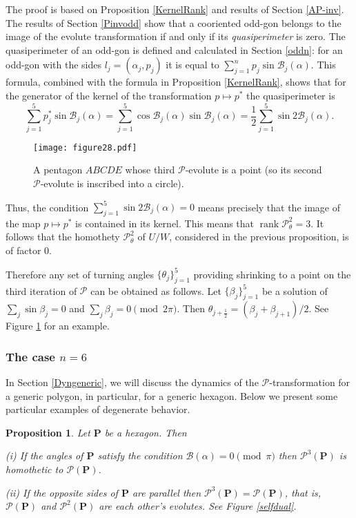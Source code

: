 \documentclass[12pt]{article}
\makeatletter
\newtheorem{proposition}[lemma]{Proposition}
\renewenvironment{proof}[1][\proofname] 
{\par\pushQED{\qed}\normalfont\topsep6\p@\@plus6\p@\relax\trivlist\item[\hskip\labelsep\bfseries#1\@addpunct{.}]\ignorespaces}{\popQED\endtrivlist\@endpefalse}
\newcommand{\B}{\mathcal{B}}
\newcommand{\Pev}{\mathcal{P}}
\renewcommand{\P}{\mathbf{P}}
\newcommand{\rk}{\operatorname{rank}}
\makeatother
\begin{document}
\begin{proof} The proof is based on Proposition \ref{KernelRank} and results of Section \ref{AP-inv}. The results of Section \ref{Pinvodd} show that a cooriented odd-gon belongs to the image of the evolute transformation if and only if its {\sl quasiperimeter} is zero. The quasiperimeter of an odd-gon is defined and calculated in Section \ref{oddn}: for an odd-gon with the sides $l_j=(\alpha_j,p_j)$ it is equal to $\sum_{j=1}^np_j\sin\B_j(\alpha)$. This formula, combined with the formula in Proposition \ref{KernelRank}, shows that for the generator of the kernel of the transformation $p\mapsto p^\ast$ the quasiperimeter is$$\sum_{j=1}^5 p_j^\ast\sin\B_j(\alpha)=\sum_{j=1}^5\cos\B_j(\alpha)\sin\B_j(\alpha)=\frac12\sum_{j=1}^5\sin2\B_j(\alpha).$$ 

\begin{figure}[htbp]
\centering
\texttt{[image: figure28.pdf]}
\caption{A pentagon $ABCDE$ whose third $\Pev$-evolute is a point (so its second $\Pev$-evolute is inscribed into a circle).}
\label{NilPent}
\end{figure}

Thus, the condition $\sum_{j=1}^5\sin2\B_j(\alpha) = 0$ means precisely that the image of the map $p\mapsto p^\ast$ is contained in its kernel. This means that $\rk \Pev_\theta^2 = 3$. It follows that the homothety $\Pev_\theta^2$ of $U/W$, considered in the previous proposition, is of factor $0$.
\end{proof}

Therefore any set of turning angles $\{\theta_j\}_{j=1}^5$ providing shrinking to a point on the third iteration of $\Pev$ can be obtained as follows. Let $\{\beta_j\}_{j=1}^5$ be a solution of $\sum_j\sin\beta_j=0$ and $\sum_j \beta_j = 0\pmod{2\pi}$. Then $\theta_{j+\frac12} = (\beta_j + \beta_{j+1})/2$. See Figure \ref{NilPent} for an example.

\subsubsection{The case $n=6$} \label{small6}
In Section \ref{Dyngeneric}, we will discuss the dynamics of the $\Pev$-transformation for a generic polygon, in particular, for a generic hexagon. Below we present some particular examples of degenerate behavior.

\begin{proposition}
\label{hexapar} 
Let $\P$ be a hexagon. Then\smallskip

{\rm(i)} If the angles of $\P$ satisfy the condition $\B(\alpha) = 0\pmod \pi$ then $\Pev^3(\P)$ is homothetic to $\Pev(\P)$.\smallskip

{\rm(ii)} If the opposite sides of $\P$ are parallel then $\Pev^3(\P)=\Pev(\P)$, that is, 
$\Pev(\P)$ and $\Pev^2(\P)$ are each other's evolutes. See Figure \ref{selfdual}.
\end{proposition}
\end{document}
